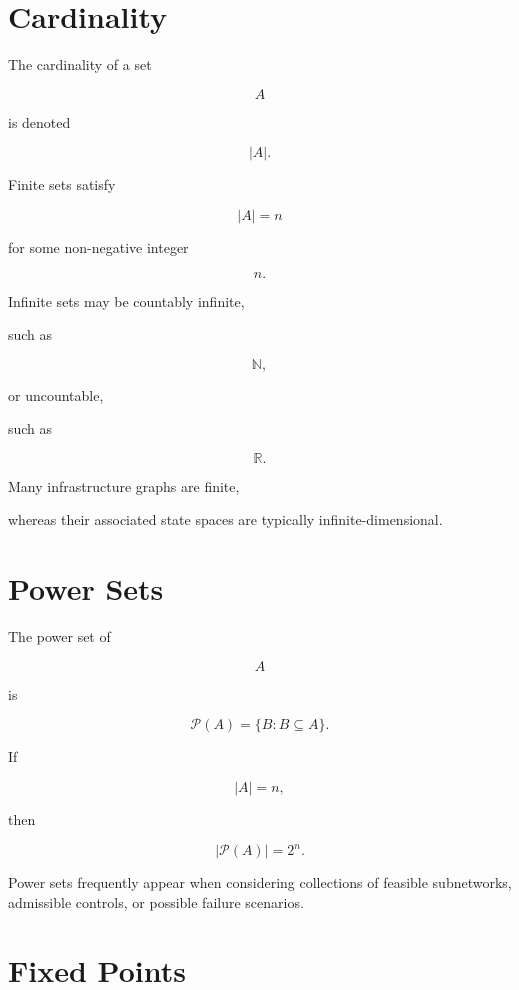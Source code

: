 \documentclass[11pt,fleqn]{book}
\numberwithin{equation}{chapter}
\theoremstyle{plain}
\theoremstyle{definition}
\theoremstyle{remark}
\begin{document}

\section{Cardinality}

The cardinality of a set

\[
A
\]

is denoted

\[
|A|.
\]

Finite sets satisfy

\[
|A|
=
n
\]

for some non-negative integer

\[
n.
\]

Infinite sets may be countably infinite,

such as

\[
\mathbb N,
\]

or uncountable,

such as

\[
\mathbb R.
\]

Many infrastructure graphs are finite,

whereas their associated state spaces are typically infinite-dimensional.


\section{Power Sets}

The power set of

\[
A
\]

is

\[
\mathcal P(A)
=
\{B:B\subseteq A\}.
\]

If

\[
|A|
=
n,
\]

then

\[
|\mathcal P(A)|
=
2^n.
\]

Power sets frequently appear when considering collections of feasible
subnetworks, admissible controls, or possible failure scenarios.


\section{Fixed Points}
\end{document}
